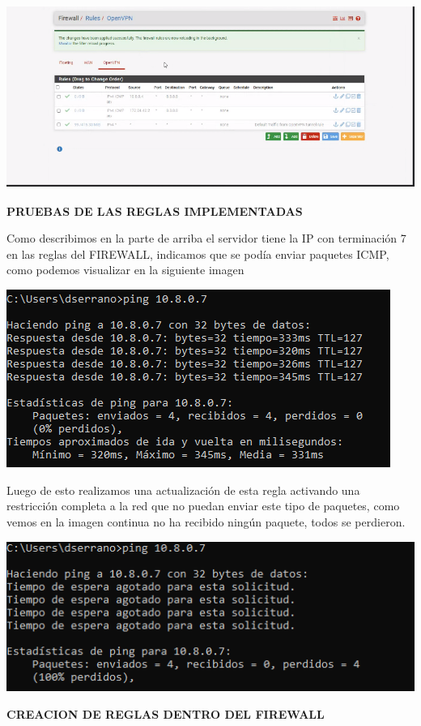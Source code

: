 \documentclass[
]{article}
\begin{document}
\includegraphics[width=5.67708in,height=2.35417in]{media/image7.png}

\textbf{PRUEBAS DE LAS REGLAS IMPLEMENTADAS}

Como describimos en la parte de arriba el servidor tiene la IP con
terminación 7 en las reglas del FIREWALL, indicamos que se podía enviar
paquetes ICMP, como podemos visualizar en la siguiente imagen

\includegraphics[width=4.9375in,height=2.28125in]{media/image8.png}

Luego de esto realizamos una actualización de esta regla activando una
restricción completa a la red que no puedan enviar este tipo de
paquetes, como vemos en la imagen continua no ha recibido ningún
paquete, todos se perdieron.

\includegraphics[width=5.29167in,height=1.92708in]{media/image9.png}

\textbf{CREACION DE REGLAS DENTRO DEL FIREWALL}
\end{document}
